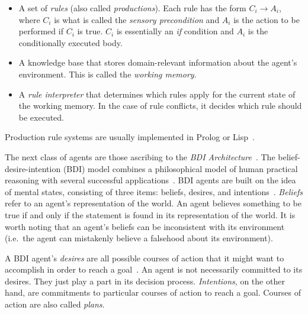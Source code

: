 \begin{itemize}

    \item A set of \textit{rules} (also called \textit{productions}).
        Each rule has the form $ C_i \rightarrow A_i $,
        where $ C_i $ is what is called the \textit{sensory precondition}
        and $ A_i $ is the action to be performed if $ C_i $ is true.
        $ C_i $ is essentially an \textit{if} condition and $ A_i $ is the conditionally executed body.

    \item A knowledge base that stores domain-relevant information about the agent's environment.
        This is called the \textit{working memory}.

    \item A \textit{rule interpreter} that determines which rules apply for the current state of the working memory.
        In the case of rule conflicts, it decides which rule should be executed.

\end{itemize}


Production rule systems are usually implemented in Prolog or Lisp~\citep{balke_how_2014}.

The next class of agents are those ascribing to the \textit{BDI Architecture}~\citep{balke_how_2014}.
The belief-desire-intention (BDI) model combines a philosophical model of human practical reasoning
with several successful applications~\citep{georgeff_belief-desire-intention_1999}.
BDI agents are built on the idea of mental states,
consisting of three items: beliefs, desires, and intentions~\citep{balke_how_2014}.
\textit{Beliefs} refer to an agent's representation of the world.
An agent believes something to be true if and only if the statement is found in its representation of the world.
It is worth noting that an agent's beliefs can be inconsistent with its environment (i.e.~the agent can mistakenly believe a falsehood about its environment).

A BDI agent's \textit{desires} are all possible courses of action that it might want to accomplish in order to reach a goal~\citep{balke_how_2014}.
An agent is not necessarily committed to its desires.
They just play a part in its decision process.
\textit{Intentions}, on the other hand, are commitments to particular courses of action to reach a goal.
Courses of action are also called \textit{plans}.

